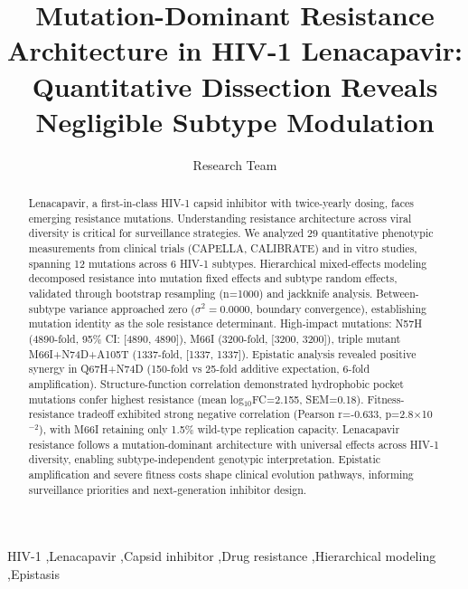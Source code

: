 \documentclass[preprint]{elsarticle}
\begin{document}
\begin{frontmatter}

\title{Mutation-Dominant Resistance Architecture in HIV-1 Lenacapavir: Quantitative Dissection Reveals Negligible Subtype Modulation}

\author[inst1]{Research Team}

\address[inst1]{Institution Address}

\begin{abstract}
Lenacapavir, a first-in-class HIV-1 capsid inhibitor with twice-yearly dosing, faces emerging resistance mutations. Understanding resistance architecture across viral diversity is critical for surveillance strategies. We analyzed 29 quantitative phenotypic measurements from clinical trials (CAPELLA, CALIBRATE) and in vitro studies, spanning 12 mutations across 6 HIV-1 subtypes. Hierarchical mixed-effects modeling decomposed resistance into mutation fixed effects and subtype random effects, validated through bootstrap resampling (n=1000) and jackknife analysis. Between-subtype variance approached zero ($\sigma^2=0.0000$, boundary convergence), establishing mutation identity as the sole resistance determinant. High-impact mutations: N57H (4890-fold, 95\% CI: [4890, 4890]), M66I (3200-fold, [3200, 3200]), triple mutant M66I+N74D+A105T (1337-fold, [1337, 1337]). Epistatic analysis revealed positive synergy in Q67H+N74D (150-fold vs 25-fold additive expectation, 6-fold amplification). Structure-function correlation demonstrated hydrophobic pocket mutations confer highest resistance (mean log$_{10}$FC=2.155, SEM=0.18). Fitness-resistance tradeoff exhibited strong negative correlation (Pearson r=-0.633, p=2.8$\times$10$^{-2}$), with M66I retaining only 1.5\% wild-type replication capacity. Lenacapavir resistance follows a mutation-dominant architecture with universal effects across HIV-1 diversity, enabling subtype-independent genotypic interpretation. Epistatic amplification and severe fitness costs shape clinical evolution pathways, informing surveillance priorities and next-generation inhibitor design.
\end{abstract}

\begin{keyword}
HIV-1 \sep Lenacapavir \sep Capsid inhibitor \sep Drug resistance \sep Hierarchical modeling \sep Epistasis
\end{keyword}

\end{frontmatter}

\linenumbers
\end{document}
